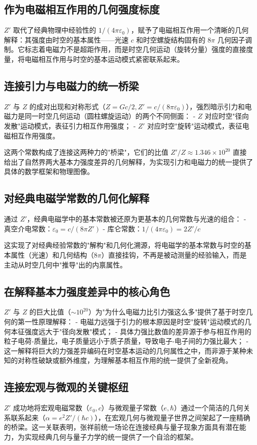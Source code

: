 \documentclass[a4paper,12pt]{article}
\theoremstyle{plain}
\begin{document}
\subsection{作为电磁相互作用的几何强度标度}
$Z'$ 取代了经典物理中经验性的 $1/(4\pi\varepsilon_0)$，赋予了电磁相互作用一个清晰的几何解释：其强度由时空的基本属性——光速 $c$ 和时空螺旋结构固有的 $8\pi$ 几何因子调制。它标志着电磁力不是超距作用，而是时空几何运动（旋转分量）强度的直接度量，将电磁相互作用与时空的基本运动模式紧密联系起来。

\subsection{连接引力与电磁力的统一桥梁}
$Z'$ 与 $Z$ 的成对出现和对称形式（$Z = Gc/2, Z' = c/(8\pi\varepsilon_0)$），强烈暗示引力和电磁力是同一时空几何运动（圆柱螺旋运动）的两个不同侧面：
- $Z$ 对应时空"径向发散"运动模式，表征引力相互作用强度；
- $Z'$ 对应时空"旋转"运动模式，表征电磁相互作用强度。

这两个常数构成了连接这两种力的"桥梁"，它们的比值 $Z'/Z \approx 1.346\times10^{20}$ 直接给出了自然界两大基本力强度差异的几何解释，为实现引力和电磁力的统一提供了具体的数学框架和物理图像。

\subsection{对经典电磁学常数的几何化解释}
通过 $Z'$，经典电磁学中的基本常数被还原为更基本的几何常数与光速的组合：
- 真空介电常数：$\varepsilon_0 = c / (8\pi Z')$
- 库仑常数：$1/(4\pi\varepsilon_0) = 2Z'/c$

这实现了对经典经验常数的"解构"和几何化溯源，将电磁学的基本常数与时空的基本属性（光速）和几何结构（$8\pi$）直接挂钩，不再是被动测量的经验输入，而是主动从时空几何中"推导"出的内禀属性。

\subsection{在解释基本力强度差异中的核心角色}
$Z'$ 与 $Z$ 的巨大比值（$\sim10^{20}$）为"为什么电磁力比引力强这么多"提供了基于时空几何的第一性原理解释：
- 电磁力远强于引力的根本原因是时空"旋转"运动模式的几何本征强度远大于"径向发散"模式；
- 具体力强比数值的差异源于参与相互作用的粒子电荷-质量比，电子质量远小于质子质量，导致电子-电子间的力强比最大；
- 这一解释将巨大的力强差异编码在时空基本运动的几何属性之中，而非源于某种未知的对称性破缺或额外维度，为理解基本相互作用的统一提供了全新视角。

\subsection{连接宏观与微观的关键枢纽}
$Z'$ 成功地将宏观电磁常数（$\varepsilon_0, c$）与微观量子常数（$e, \hbar$）通过一个简洁的几何关系联系起来（$\alpha = e^2Z'/(\hbar c)$），在宏观几何与微观量子世界之间架起了一座精确的桥梁。这一关联表明，张祥前统一场论在连接经典与量子现象方面具有潜在能力，为实现经典几何与量子力学的统一提供了一个自洽的框架。
\end{document}
